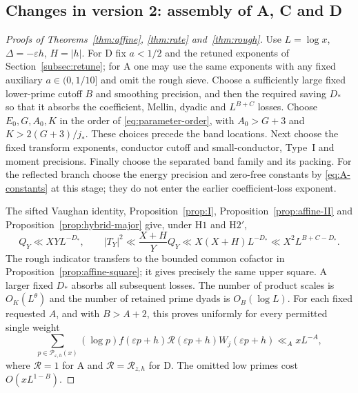 \documentclass[11pt]{article}
\theoremstyle{definition}
\theoremstyle{remark}
\numberwithin{equation}{section}
\begin{document}
\subsection{Changes in version 2: assembly of A, C and D}\label{subsec:affine-assembly}
\begin{proof}[Proofs of Theorems~\ref{thm:affine}, \ref{thm:rate} and~\ref{thm:rough}]
Use $L=\log x$, $\Delta=-\varepsilon h$, $H=|h|$.
For D fix $a<1/2$ and the retuned exponents of
Section~\ref{subsec:retune}; for A one may use the same exponents
with any fixed auxiliary $a\in(0,1/10]$ and omit the rough sieve.
Choose a sufficiently large fixed lower-prime cutoff $B$ and
smoothing precision, and then the required saving $D_*$ so that
it absorbs the coefficient, Mellin, dyadic and $L^{B+C}$ losses.
Choose $E_0,G,A_0,K$ in the order of
\eqref{eq:parameter-order}, with $A_0>G+3$ and
$K>2(G+3)/j_*$. These choices precede the band locations.
Next choose the fixed transform exponents, conductor cutoff and
small-conductor, Type~I and moment precisions. Finally choose
the separated band family and its packing. For the reflected
branch choose the energy precision and zero-free constants by
\eqref{eq:A-constants} at this stage; they do not enter the
earlier coefficient-loss exponent.

The sifted Vaughan identity, Proposition~\ref{prop:I},
Proposition~\ref{prop:affine-II} and
Proposition~\ref{prop:hybrid-major} give, under $\mathrm H1$
and $\mathrm H2'$,
\begin{equation}\label{eq:affine-assembly-square}
 Q_Y\ll XYL^{-D_*},\qquad
 |T_Y|^2\ll\frac{X+H}{Y}Q_Y
       \ll X(X+H)L^{-D_*}\ll X^2L^{B+C-D_*}.
\end{equation}
The rough indicator transfers to the bounded common cofactor
in Proposition~\ref{prop:affine-square}; it gives precisely the
same upper square. A larger fixed $D_*$ absorbs all subsequent
losses. The number of product scales is $O_K(L^\theta)$ and
the number of retained prime dyads is $O_B(\log L)$.
For each fixed requested $A$, and with $B>A+2$, this proves
uniformly for every permitted single weight
\begin{equation}\label{v2:6-12}
 \sum_{p\in\mathcal P_{\varepsilon,h}(x)}(\log p)
 f(\varepsilon p+h)\mathcal R(\varepsilon p+h)W_j(\varepsilon p+h)
       \ll_A xL^{-A},
\end{equation}
where $\mathcal R=1$ for A and $\mathcal R=\mathcal R_{z,h}$
for D. The omitted low primes cost $O(xL^{1-B})$.


\end{proof}
\end{document}
